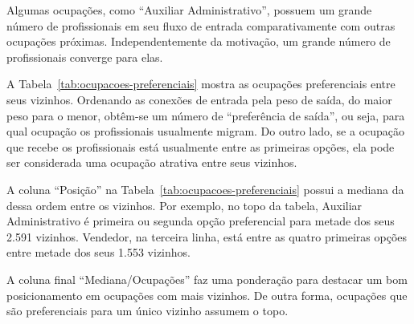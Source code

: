 \documentclass[12pt,a4paper]{article}
\begin{document}
Algumas ocupações, como \enquote{Auxiliar Administrativo}, possuem um grande número de profissionais em seu fluxo de entrada comparativamente com outras ocupações próximas. Independentemente da motivação, um grande número de profissionais converge para elas.

A Tabela~\ref{tab:ocupacoes-preferenciais} mostra as ocupações preferenciais entre seus vizinhos. Ordenando as conexões de entrada pela peso de saída, do maior peso para o menor, obtêm-se um número de \enquote{preferência de saída}, ou seja, para qual ocupação os profissionais usualmente migram. Do outro lado, se a ocupação que recebe os profissionais está usualmente entre as primeiras opções, ela pode ser considerada uma ocupação atrativa entre seus vizinhos.

A coluna \enquote{Posição} na Tabela~\ref{tab:ocupacoes-preferenciais} possui a mediana da dessa ordem entre os vizinhos. Por exemplo, no topo da tabela, Auxiliar Administrativo é primeira ou segunda opção preferencial para metade dos seus 2.591 vizinhos. Vendedor, na terceira linha, está entre as quatro primeiras opções entre metade dos seus 1.553 vizinhos.

A coluna final \enquote{Mediana/Ocupações} faz uma ponderação para destacar um bom posicionamento em ocupações com mais vizinhos. De outra forma, ocupações que são preferenciais para um único vizinho assumem o topo.
\end{document}
